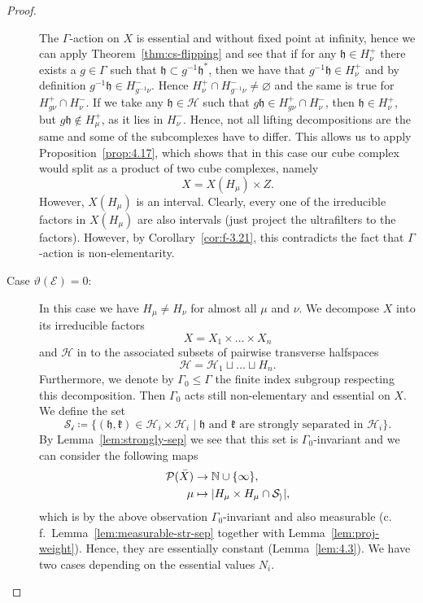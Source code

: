 \begin{proof}
\begin{description}
    The \(\Gamma\)-action on \(X\) is essential and without fixed point at infinity, hence we can apply Theorem~\ref{thm:cs-flipping} and see that if for any \(\mathfrak{h} \in H_{\nu}^+\) there exists a \(g \in \Gamma\) such that \(\mathfrak{h} \subset g^{-1}\mathfrak{h}^\ast \), then we have that \(g^{-1}\mathfrak{h} \in H_\nu^+\) and by definition \(g^{-1} \mathfrak{h} \in H_{g^{-1}\nu}^-\). Hence \(H_\nu^+ \cap H_{g^{-1}\nu}^- \neq \varnothing\) and the same is true for \(H_{g\nu}^+ \cap H_{\nu}^-\). If we take any \(\mathfrak{h} \in \mathcal{H}\) such that \(g\mathfrak{h} \in H_{g\nu}^+ \cap H_\nu^-\), then \(\mathfrak{h} \in H_{\nu}^+\), but \(g\mathfrak{h} \not \in H_\mu^+\), as it lies in \(H_\nu^-\). Hence, not all lifting decompositions are the same and some of the subcomplexes have to differ. This allows us to apply Proposition~\ref{prop:4.17}, which shows that in this case our cube complex would split as a product of two cube complexes, namely
    \[
      X = X(H_\mu) \times Z.
    \]
    However, \(X(H_\mu)\) is an interval. Clearly, every one of the irreducible factors in \(X(H_\mu)\) are also intervals (just project the ultrafilters to the factors). However, by Corollary~\ref{cor:f-3.21}, this contradicts the fact that \(\Gamma\)-action is non-elementarity.
  \item[Case \(\vartheta(\mathcal{E})=0\):] In this case we have \(H_\mu \neq H_\nu\) for almost all \(\mu\) and \(\nu\). We decompose \(X\) into its irreducible factors
    \[
      X = X_1 \times \dots \times X_n
    \]
    and \(\mathcal{H}\) in to the associated subsets of pairwise transverse halfspaces
    \[
      \mathcal{H} = \mathcal{H}_1 \sqcup \dots \sqcup H_n.
    \]
    Furthermore, we denote by \(\Gamma_0 \leq \Gamma\) the finite index subgroup respecting this decomposition. Then \(\Gamma_0\) acts still non-elementary and essential on \(X\). We define the set
    \[
      \mathcal{S_i} \coloneqq \{(\mathfrak{h}, \mathfrak{k}) \in \mathcal{H}_i \times \mathcal{H}_i \mid \mathfrak{h} \text{ and } \mathfrak{k} \text{ are strongly separated in } \mathcal{H}_i\}.
    \]
    By Lemma~\ref{lem:strongly-sep} we see that this set is \(\Gamma_0\)-invariant and we can consider the following maps
    \begin{align*}
      \mathcal{P}(\bar X) &\to \mathbb{N} \cup \{\infty\},\\
      \mu &\mapsto |H_\mu \times H_\mu \cap \mathcal{S_i}|,
    \end{align*}
    which is by the above observation \(\Gamma_0\)-invariant and also measurable (c.\,f.\ Lemma~\ref{lem:measurable-str-sep} together with Lemma~\ref{lem:proj-weight}). Hence, they are essentially constant (Lemma~\ref{lem:4.3}). We have two cases depending on the essential values \(N_i\).

\end{description}
\end{proof}

